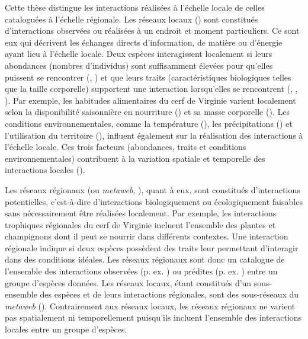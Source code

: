 Cette thèse distingue les interactions réalisées à l'échelle locale de celles
cataloguées à l'échelle régionale. Les réseaux locaux
(\cite{Poisot2012Dissimilarity}) sont constitués d'interactions observées ou
réalisées à un endroit et moment particuliers. Ce sont eux qui décrivent les
échanges directs d'information, de matière ou d'énergie ayant lieu à l'échelle
locale. Deux espèces interagissent localement si leurs abondances (nombres
d'individus) sont suffisamment élevées pour qu'elles puissent se rencontrer
(\cite{Canard2012Emergence}, \cite{Canard2014Empirical}) et que leurs traits
(caractéristiques biologiques telles que la taille corporelle) supportent une
interaction lorsqu'elles se rencontrent (\cite{Bolnick2011Why},
\cite{Gravel2013Inferring}, \cite{Stouffer2011Role}). Par exemple, les habitudes
alimentaires du cerf de Virginie varient localement selon la disponibilité
saisonnière en nourriture (\cite{Short1975Nutrition}) et sa masse corporelle
(\cite{Luna2013Influence}). Les conditions environnementales, comme la
température (\cite{Angilletta2004Temperature}), les précipitations
(\cite{Woodward2012Climate}) et l'utilisation du territoire
(\cite{Tylianakis2007Habitat}), influent également sur la réalisation des
interactions à l'échelle locale. Ces trois facteurs (abondances, traits et
conditions environnementales) contribuent à la variation spatiale et temporelle
des interactions locales (\cite{Poisot2015Species}). 

Les réseaux régionaux (ou \textit{metaweb}, \cite{Pascual2006Ecological}), quant
à eux, sont constitués d'interactions potentielles, c'est-à-dire d'interactions
biologiquement ou écologiquement faisables sans nécessairement être réalisées
localement. Par exemple, les interactions trophiques régionales du cerf de
Virginie incluent l'ensemble des plantes et champignons dont il peut se nourrir
dans différents contextes. Une interaction régionale indique si deux espèces
possèdent des traits leur permettant d'interagir dans des conditions idéales.
Les réseaux régionaux sont donc un catalogue de l'ensemble des interactions
observées (p. ex. \cite{Maiorano2020Tetraeu}) ou prédites (p. ex.
\cite{Strydom2022Food}) entre un groupe d'espèces données. Les réseaux locaux,
étant constitués d'un sous-ensemble des espèces et de leurs interactions
régionales, sont des sous-réseaux du \textit{metaweb}
(\cite{Saravia2022Ecological}). Contrairement aux réseaux locaux, les réseaux
régionaux ne varient pas spatialement ni temporellement puisqu'ils incluent
l'ensemble des interactions locales entre un groupe d'espèces. 

